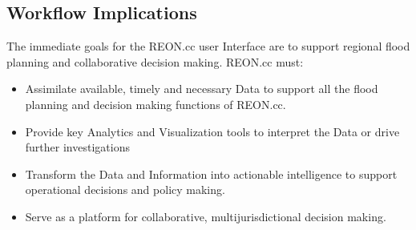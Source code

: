 \documentclass[letterpaper,12pt,english]{book}
\begin{document}
\subsection{Workflow Implications}
\label{\detokenize{requirements/workflow/index:workflow-implications}}\label{\detokenize{requirements/workflow/index::doc}}
\sphinxAtStartPar
The immediate goals for the REON.cc user Interface are to support regional flood
planning and collaborative decision making. REON.cc must:
\begin{itemize}
\item {} 
\sphinxAtStartPar
Assimilate available, timely and necessary Data to support all the flood
planning and decision making functions of REON.cc.

\item {} 
\sphinxAtStartPar
Provide key Analytics and Visualization tools to interpret the Data or drive
further investigations

\item {} 
\sphinxAtStartPar
Transform the Data and Information into actionable intelligence to support
operational decisions and policy making.

\item {} 
\sphinxAtStartPar
Serve as a platform for collaborative, multi\sphinxhyphen{}jurisdictional decision making.

\end{itemize}
\end{document}
